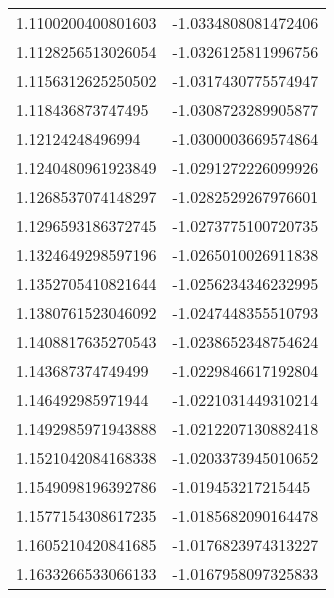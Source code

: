 \begin{supertabular}{ll}
1.1100200400801603  & -1.0334808081472406   \\
1.1128256513026054  & -1.0326125811996756   \\
1.1156312625250502  & -1.0317430775574947   \\
1.118436873747495   & -1.0308723289905877   \\
1.12124248496994    & -1.0300003669574864   \\
1.1240480961923849  & -1.0291272226099926   \\
1.1268537074148297  & -1.0282529267976601   \\
1.1296593186372745  & -1.0273775100720735   \\
1.1324649298597196  & -1.0265010026911838   \\
1.1352705410821644  & -1.0256234346232995   \\
1.1380761523046092  & -1.0247448355510793   \\
1.1408817635270543  & -1.0238652348754624   \\
1.143687374749499   & -1.0229846617192804   \\
1.146492985971944   & -1.0221031449310214   \\
1.1492985971943888  & -1.0212207130882418   \\
1.1521042084168338  & -1.0203373945010652   \\
1.1549098196392786  & -1.019453217215445    \\
1.1577154308617235  & -1.0185682090164478   \\
1.1605210420841685  & -1.0176823974313227   \\
1.1633266533066133  & -1.0167958097325833   \\
\end{supertabular}
